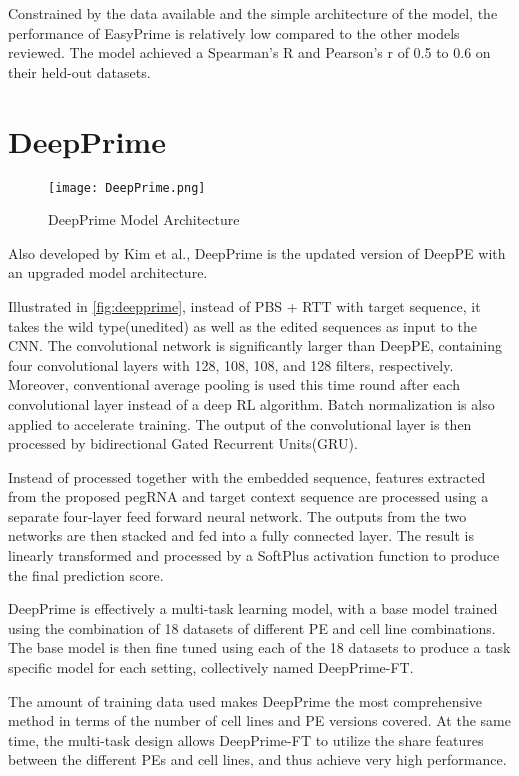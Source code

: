 Constrained by the data available and the simple architecture of the model, the performance of EasyPrime is relatively low compared to the other models reviewed. The model achieved a Spearman's R and Pearson's r of 0.5 to 0.6 on their held-out datasets.

\section{DeepPrime}

\begin{figure}[ht]
    \centering
    \texttt{[image: DeepPrime.png]}
    \caption{DeepPrime Model Architecture}
    \label{fig:deepprime}
\end{figure}


Also developed by Kim et al., DeepPrime is the updated version of DeepPE with an upgraded model architecture. 

Illustrated in \autoref{fig:deepprime}, instead of PBS + RTT with target sequence, it takes the wild type(unedited) as well as the edited sequences as input to the CNN. The convolutional network is significantly larger than DeepPE, containing four convolutional layers with 128, 108, 108, and 128 filters, respectively. Moreover, conventional average pooling is used this time round after each convolutional layer instead of a deep RL algorithm. Batch normalization is also applied to accelerate training.  The output of the convolutional layer is then processed by bidirectional Gated Recurrent Units(GRU). 

Instead of processed together with the embedded sequence, features extracted from the proposed pegRNA and target context sequence are processed using a separate four-layer feed forward neural network. The outputs from the two networks are then stacked and fed into a fully connected layer. The result is linearly transformed and processed by a SoftPlus activation function to produce the final prediction score.


DeepPrime is effectively a multi-task learning model, with a base model trained using the combination of 18 datasets of different PE and cell line combinations. The base model is then fine tuned using each of the 18 datasets to produce a task specific model for each setting, collectively named DeepPrime-FT.  

The amount of training data used makes DeepPrime the most comprehensive method in terms of the number of cell lines and PE versions covered. At the same time, the multi-task design allows DeepPrime-FT to utilize the share features between the different PEs and cell lines, and thus achieve very high performance. 

